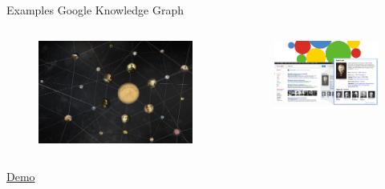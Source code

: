 \documentclass[onlymath,xcolor=pdftex,dvipsnames,table]{beamer}
\newcommand{\head}[1]{{\large\color{OliveGreen}#1\\[2pt]}}
\begin{document}
\begin{frame}{Examples}
\head{Google Knowledge Graph~\cite{googleknowledgegraph}}
\begin{columns}[c]
  \begin{figure}
    \centering
    \includegraphics[width=\linewidth]{120701_google_knowledge_graph.jpg}
  \end{figure}
  \begin{figure}
    \centering
    \includegraphics[width=\linewidth]{Google-Knowledge-Graph.jpg}
  \end{figure}
\end{columns}
\begin{center}
  \href{http://www.google.com/insidesearch/features/search/knowledge.html}{\large Demo}
\end{center}
\end{frame}
\end{document}
